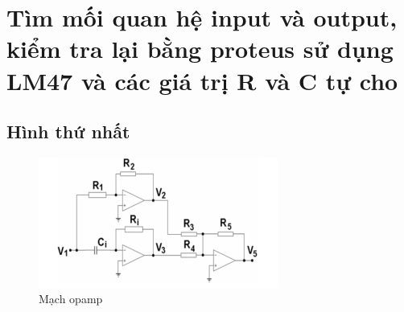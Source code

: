 \section{Tìm mối quan hệ input và output, kiểm tra lại bằng proteus sử dụng LM47 và các giá trị R và C tự cho}
    \subsection{Hình thứ nhất}
        \begin{figure}[H]
            \centering
            \includegraphics[width=0.7\textwidth]{pictures/topic2_a.png}
            \caption{Mạch opamp}					
            \label{fig:circuit_simulation}
        \end{figure}
